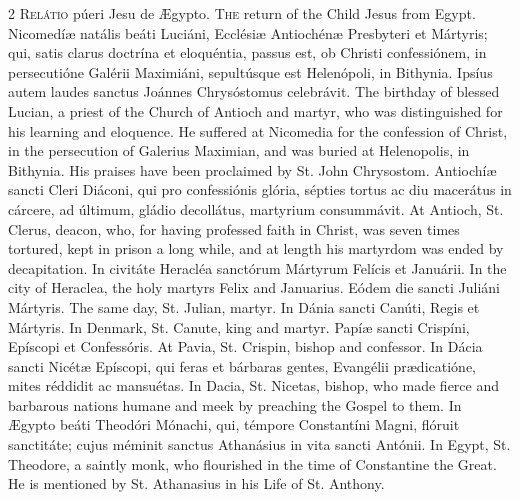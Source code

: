 \begin{paracol}{2}
\lettrine[lines=1]{R}{elátio} púeri Jesu de Ægypto.
\switchcolumn
{}
\lettrine[lines=1]{T}{he} return of the Child Jesus from Egypt.
\switchcolumn*
{}
Nicomedíæ natális beáti Luciáni, Ecclésiæ 
 Antiochénæ Presbyteri et Mártyris; qui, satis clarus doctrína et eloquéntia, 
 passus est, ob Christi confessiónem, in persecutióne Galérii Maximiáni, 
 sepultúsque est Helenópoli, in Bithynia. Ipsíus autem laudes sanctus 
 Joánnes Chrysóstomus celebrávit.
\switchcolumn
{}
The birthday of blessed Lucian, a priest of the Church of Antioch and 
 martyr, who was distinguished for his learning and eloquence. He 
 suffered at Nicomedia for the confession of Christ, in the persecution of 
 Galerius Maximian, and was buried at Helenopolis, in Bithynia. His 
 praises have been proclaimed by St. John Chrysostom.
\switchcolumn*
{}
Antiochíæ sancti Cleri Diáconi, qui pro 
 confessiónis glória, sépties tortus ac diu macerátus in cárcere, ad últimum, 
 gládio decollátus, martyrium consummávit.
\switchcolumn
{}
At Antioch, St. Clerus, deacon, who, for having professed faith in Christ, 
 was seven times tortured, kept in prison a long while, and at length his 
 martyrdom was ended by decapitation.
\switchcolumn*
{}
In civitáte Heracléa sanctórum Mártyrum Felícis et Januárii.
\switchcolumn
{}
In the city of Heraclea, the holy martyrs Felix and Januarius.
\switchcolumn*
{}
Eódem die sancti Juliáni Mártyris.
\switchcolumn
{}
The same day, St. Julian, martyr.
\switchcolumn*
{}
In Dánia sancti Canúti, Regis et Mártyris.
\switchcolumn
{}
In Denmark, St. Canute, king and martyr.
\switchcolumn*
{}
Papíæ sancti Crispíni, Epíscopi et Confessóris.
\switchcolumn
{}
At Pavia, St. Crispin, bishop and confessor.
\switchcolumn*
{}
In Dácia sancti Nicétæ Epíscopi, qui feras et 
 bárbaras gentes, Evangélii prædicatióne, mites réddidit ac mansuétas.
\switchcolumn
{}
In Dacia, St. Nicetas, bishop, who made fierce and barbarous nations humane 
 and meek by preaching the Gospel to them.
\switchcolumn*
{}
In Ægypto beáti Theodóri Mónachi, qui, témpore 
 Constantíni Magni, flóruit sanctitáte; cujus méminit sanctus Athanásius in 
 vita sancti Antónii.
\switchcolumn
{}
In Egypt, St. Theodore, a saintly monk, who flourished in the time of 
 Constantine the Great. He is mentioned by St. Athanasius in his Life 
 of St. Anthony.
\switchcolumn*
{}
\end{paracol}


